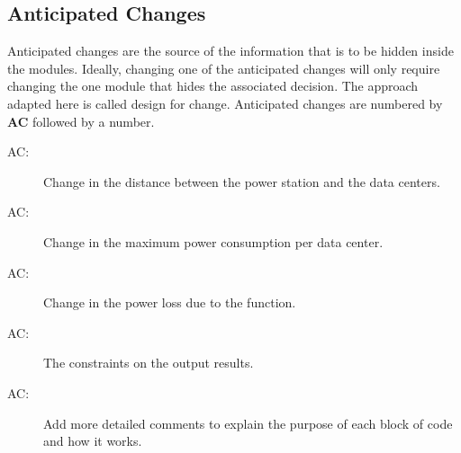 \documentclass[12pt]{article}
\newcounter{acnum}
\newcommand{\actheacnum}{AC\theacnum}
\begin{document}
\subsection{Anticipated Changes} \label{SecAchange}

Anticipated changes are the source of the information that is to be hidden
inside the modules. Ideally, changing one of the anticipated changes will only
require changing the one module that hides the associated decision. The approach
adapted here is called design for
change. Anticipated changes are numbered by \textbf{AC} followed by a number.

\begin{description}

\item[ \actheacnum \label{acParams}:] Change in the distance between the power station and the data centers.
\item[ \actheacnum \label{acVerify}:] Change in the maximum power consumption per data center.
\item[ \actheacnum \label{acOutput}:] Change in the power loss due to the function.
\item[ \actheacnum \label{acVerifyOut}:] The constraints on the output results.
\item[ \actheacnum \label{acODEs}:] Add more detailed comments to explain the purpose of each block of code and how it works.


\end{description}
\end{document}
